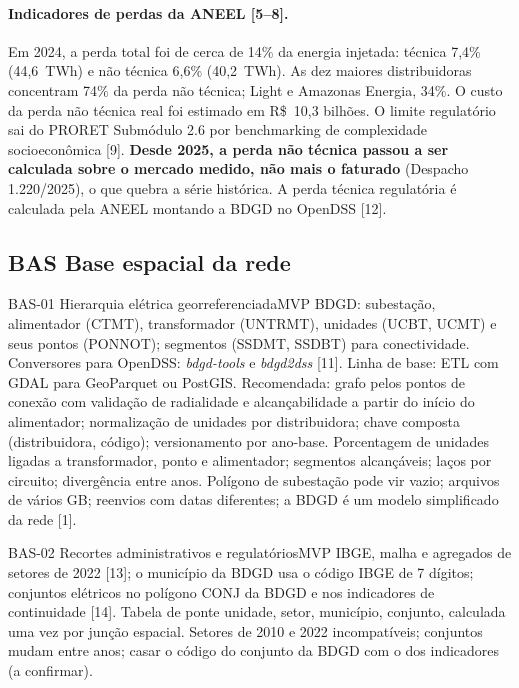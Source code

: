 \paragraph{Indicadores de perdas da ANEEL [5--8].} Em 2024, a perda total foi
de cerca de 14\% da energia injetada: técnica 7,4\% (44,6~TWh) e não técnica
6,6\% (40,2~TWh). As dez maiores distribuidoras concentram 74\% da perda não
técnica; Light e Amazonas Energia, 34\%. O custo da perda não técnica real foi
estimado em R\$~10,3 bilhões. O limite regulatório sai do PRORET Submódulo
2.6 por benchmarking de complexidade socioeconômica [9]. \textbf{Desde 2025, a
perda não técnica passou a ser calculada sobre o mercado medido, não mais o
faturado} (Despacho 1.220/2025), o que quebra a série histórica. A perda
técnica regulatória é calculada pela ANEEL montando a BDGD no OpenDSS [12].

\subsection{BAS \textperiodcentered{} Base espacial da rede}

\begin{ficha}{BAS-01 \textperiodcentered{} Hierarquia elétrica georreferenciada}{MVP}
 BDGD: subestação, alimentador (CTMT), transformador (UNTRMT),
unidades (UCBT, UCMT) e seus pontos (PONNOT); segmentos (SSDMT, SSDBT) para
conectividade. Conversores para OpenDSS: \emph{bdgd-tools} e
\emph{bdgd2dss} [11].
 Linha de base: ETL com GDAL para GeoParquet ou PostGIS.
Recomendada: grafo pelos pontos de conexão com validação de radialidade e
alcançabilidade a partir do início do alimentador; normalização de unidades
por distribuidora; chave composta (distribuidora, código); versionamento por
ano-base.
 Porcentagem de unidades ligadas a transformador, ponto e
alimentador; segmentos alcançáveis; laços por circuito; divergência entre
anos.
 Polígono de subestação pode vir vazio; arquivos de vários
GB; reenvios com datas diferentes; a BDGD é um modelo simplificado da rede
[1].
\end{ficha}

\begin{ficha}{BAS-02 \textperiodcentered{} Recortes administrativos e regulatórios}{MVP}
 IBGE, malha e agregados de setores de 2022 [13]; o município da
BDGD usa o código IBGE de 7 dígitos; conjuntos elétricos no polígono CONJ da
BDGD e nos indicadores de continuidade [14].
 Tabela de ponte unidade, setor, município, conjunto,
calculada uma vez por junção espacial.
 Setores de 2010 e 2022 incompatíveis; conjuntos mudam
entre anos; casar o código do conjunto da BDGD com o dos indicadores (a
confirmar).
\end{ficha}

